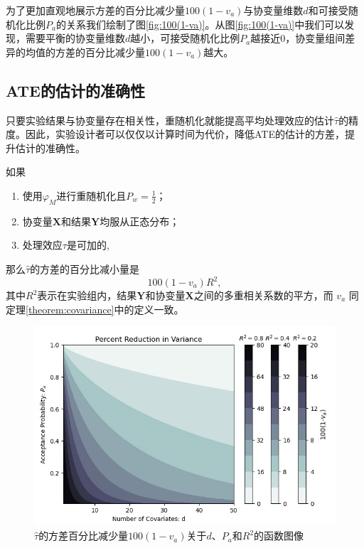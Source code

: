 为了更加直观地展示方差的百分比减少量$100(1-v_a)$与协变量维数$d$和可接受随机化比例$P_a$的关系我们绘制了图\ref{fig:100(1-va)}。从图\ref{fig:100(1-va)}中我们可以发现，需要平衡的协变量维数$d$越小，可接受随机化比例$P_a$越接近0，协变量组间差异的均值的方差的百分比减少量$100(1-v_a)$越大。



\subsection{ATE的估计的准确性}

只要实验结果与协变量存在相关性，重随机化就能提高平均处理效应的估计$\hat{\tau}$的精度。因此，实验设计者可以仅仅以计算时间为代价，降低ATE的估计的方差，提升估计的准确性。

\begin{theorem}
    如果
    \begin{enumerate}
        \item 使用$\varphi_M$进行重随机化且$P_w=\frac{1}{2}$；
        \item 协变量$\mathbf{X}$和结果$\mathbf{Y}$均服从正态分布；
        \item 处理效应$\tau$是可加的,
    \end{enumerate}
    那么$\hat\tau$的方差的百分比减小量是
    \begin{equation}
        100(1-v_a)R^2,
    \end{equation}
    其中$R^2$表示在实验组内，结果$\mathbf{Y}$和协变量$\mathbf{X}$之间的多重相关系数的平方，而 $v_a$ 同定理\ref{theorem:covariance}中的定义一致。
\end{theorem}

\begin{figure}[!htbp]
    \centering
    \includegraphics[width=0.68\linewidth]{figures/tau_percent_Reduction_in_Variance.png}
    \caption{$\hat\tau$的方差百分比减少量$100(1-v_a)$关于$d$、$P_a$和$R^2$的函数图像}
    \label{fig:tau_percent_Reduction_in_Variance}
\end{figure}

